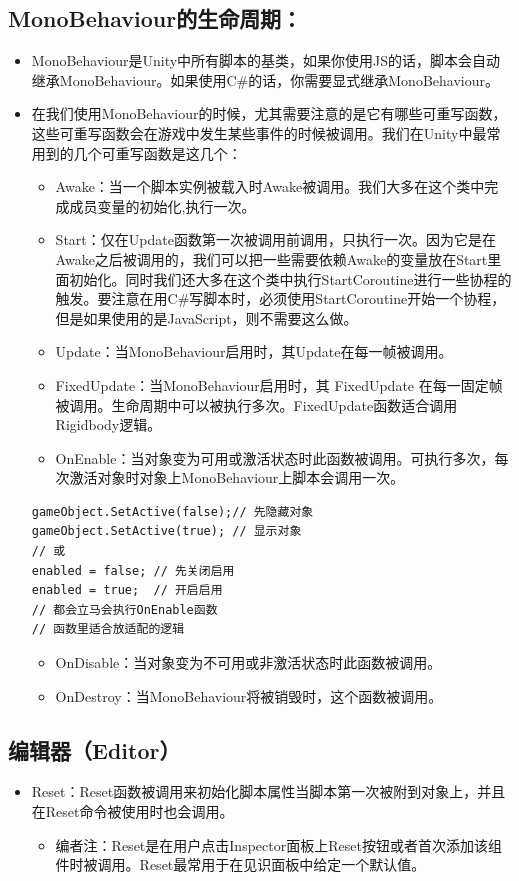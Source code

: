 \documentclass[9pt, b5paper]{article}
\begin{document}
\subsection{MonoBehaviour的生命周期：}
\label{sec:org9d4a81f}
\begin{itemize}
\item MonoBehaviour是Unity中所有脚本的基类，如果你使用JS的话，脚本会自动继承MonoBehaviour。如果使用C\#的话，你需要显式继承MonoBehaviour。
\item 在我们使用MonoBehaviour的时候，尤其需要注意的是它有哪些可重写函数，这些可重写函数会在游戏中发生某些事件的时候被调用。我们在Unity中最常用到的几个可重写函数是这几个：
\begin{itemize}
\item Awake：当一个脚本实例被载入时Awake被调用。我们大多在这个类中完成成员变量的初始化,执行一次。
\item Start：仅在Update函数第一次被调用前调用，只执行一次。因为它是在Awake之后被调用的，我们可以把一些需要依赖Awake的变量放在Start里面初始化。同时我们还大多在这个类中执行StartCoroutine进行一些协程的触发。要注意在用C\#写脚本时，必须使用StartCoroutine开始一个协程，但是如果使用的是JavaScript，则不需要这么做。
\item Update：当MonoBehaviour启用时，其Update在每一帧被调用。
\item FixedUpdate：当MonoBehaviour启用时，其 FixedUpdate 在每一固定帧被调用。生命周期中可以被执行多次。FixedUpdate函数适合调用Rigidbody逻辑。
\item OnEnable：当对象变为可用或激活状态时此函数被调用。可执行多次，每次激活对象时对象上MonoBehaviour上脚本会调用一次。
\end{itemize}
\begin{verbatim}
gameObject.SetActive(false);// 先隐藏对象
gameObject.SetActive(true); // 显示对象
// 或
enabled = false; // 先关闭启用
enabled = true;  // 开启启用
// 都会立马会执行OnEnable函数
// 函数里适合放适配的逻辑
\end{verbatim}
\begin{itemize}
\item OnDisable：当对象变为不可用或非激活状态时此函数被调用。
\item OnDestroy：当MonoBehaviour将被销毁时，这个函数被调用。
\end{itemize}
\end{itemize}
\subsection{编辑器（Editor）}
\label{sec:orgfdadcb1}
\begin{itemize}
\item Reset：Reset函数被调用来初始化脚本属性当脚本第一次被附到对象上，并且在Reset命令被使用时也会调用。 
\begin{itemize}
\item 编者注：Reset是在用户点击Inspector面板上Reset按钮或者首次添加该组件时被调用。Reset最常用于在见识面板中给定一个默认值。
\end{itemize}
\end{itemize}
\end{document}
